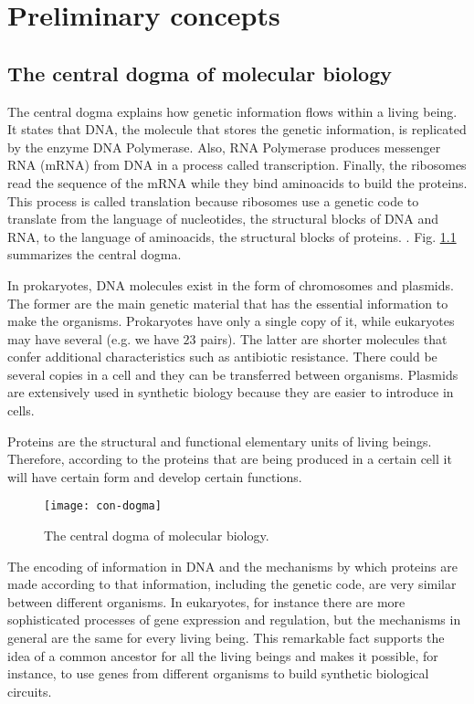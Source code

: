 \chapter{Preliminary concepts}

\section{The central dogma of molecular biology}

The central dogma explains how genetic information flows within a living being. It states that DNA, the molecule that stores the genetic information, is replicated by the enzyme DNA Polymerase. Also, RNA Polymerase produces messenger RNA (mRNA) from DNA in a process called transcription. Finally, the ribosomes read the sequence of the mRNA while they bind aminoacids to build the proteins. This process is called translation because ribosomes use a genetic code to translate from the language of nucleotides, the structural blocks of DNA and RNA, to the language of aminoacids, the structural blocks of proteins. \cite{alberts13}. Fig. \ref{fig:con-dogma} summarizes the central dogma.

In prokaryotes, DNA molecules exist in the form of chromosomes and plasmids. The former are the main genetic material that has the essential information to make the organisms. Prokaryotes have only a single copy of it, while eukaryotes may have several (e.g. we have $23$ pairs). The latter are shorter molecules that confer additional characteristics such as antibiotic resistance. There could be several copies in a cell and they can be transferred between organisms. Plasmids are extensively used in synthetic biology because they are easier to introduce in cells.

Proteins are the structural and functional elementary units of living beings. Therefore, according to the proteins that are being produced in a certain cell it will have certain form and develop certain functions. 

\begin{figure}[H]
  \centering
  \texttt{[image: con-dogma]}
  \caption[The central dogma of molecular biology]{\label{fig:con-dogma} The central dogma of molecular biology.}
\end{figure}

The encoding of information in DNA and the mechanisms by which proteins are made according to that information, including the genetic code, are very similar between different organisms. In eukaryotes, for instance there are more sophisticated processes of gene expression and regulation, but the mechanisms in general are the same for every living being. This remarkable fact supports the idea of a common ancestor for all the living beings and makes it possible, for instance, to use genes from different organisms to build synthetic biological circuits.


